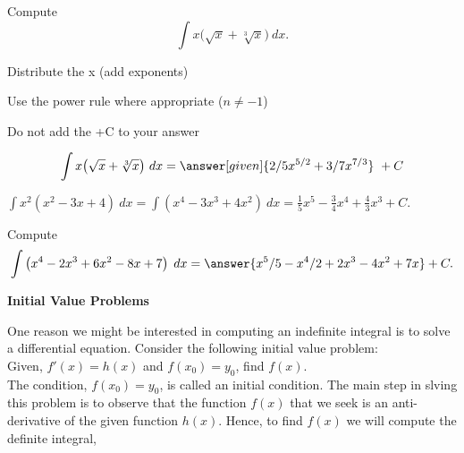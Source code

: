 \documentclass{ximera}
\begin{document}
\begin{problem} %
Compute
\[
\int x\big(\sqrt x + \sqrt[3] x \big) \ dx.
\]

\begin{hint}
Distribute the x (add exponents)
\end{hint}
\begin{hint}
Use the power rule where appropriate ($n\neq -1$)
\end{hint}
\begin{hint}
\begin{center}
Do not add the +C to your answer
\end{center}
\end{hint}

\[
\int  x\big(\sqrt x + \sqrt[3] x \big) \ dx =
\answer[given]{2/5 x^{5/2} + 3/7 x^{7/3}} \ +  C
\]
\end{problem}


\begin{example} %
$\int x^2(x^2 - 3x + 4) \ dx = \int (x^4 - 3x^3 + 4x^2) \ dx = \frac15 x^5 - \frac{3}{4}x^4 + \frac43 x^3 + C.$
\end{example}

\begin{problem}
Compute
\[
\int \left(x^4 - 2x^3 + 6x^2 - 8x + 7 \right) \; dx = \answer{ x^5/5 - x^4/2 + 2x^3 - 4x^2 + 7x} + C.
\]
\end{problem}





\begin{center}
\textbf{Initial Value Problems}
\end{center}

One reason we might be interested in computing an indefinite integral is to solve a differential equation. Consider the following initial value problem:\\
Given, $f'(x) = h(x)$ and $f(x_0) = y_0$, find $f(x)$.\\
The condition, $f(x_0) = y_0$, is called an initial condition. The main step in slving this problem is to observe that the function $f(x)$ that we seek is an anti-derivative of the given function $h(x)$. Hence, to find $f(x)$ we will compute the definite integral, 
\end{document}
